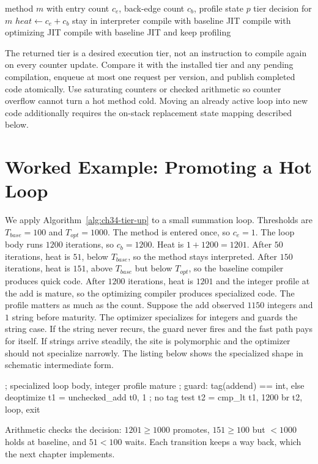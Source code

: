 \begin{algorithm}[htbp]
\caption{Tier promotion from counters and profile maturity}\label{alg:ch34-tier-up}
\begin{pseudocode}
\Require method $m$ with entry count $c_e$, back-edge count $c_b$, profile state $p$
\Ensure tier decision for $m$
\State $heat \gets c_e + c_b$
\State \Return stay in interpreter
\EndIf
{}
\State \Return compile with baseline JIT
\EndIf
{}
\State \Return compile with optimizing JIT
\EndIf
\State \Return compile with baseline JIT and keep profiling
\end{pseudocode}
\end{algorithm}

The returned tier is a desired execution tier, not an instruction to compile again on every counter update.
Compare it with the installed tier and any pending compilation, enqueue at most one request per version, and publish completed code atomically.
Use saturating counters or checked arithmetic so counter overflow cannot turn a hot method cold.
Moving an already active loop into new code additionally requires the on-stack replacement state mapping described below.

\section{Worked Example: Promoting a Hot Loop}\label{sec:ch34-worked}

We apply Algorithm~\ref{alg:ch34-tier-up} to a small summation loop.
Thresholds are $T_{base} = 100$ and $T_{opt} = 1000$.
The method is entered once, so $c_e = 1$.
The loop body runs $1200$ iterations, so $c_b = 1200$.
Heat is $1 + 1200 = 1201$.
After $50$ iterations, heat is $51$, below $T_{base}$, so the method stays interpreted.
After $150$ iterations, heat is $151$, above $T_{base}$ but below $T_{opt}$, so the baseline compiler produces quick code.
After $1200$ iterations, heat is $1201$ and the integer profile at the add is mature, so the optimizing compiler produces specialized code.
The profile matters as much as the count.
Suppose the add observed $1150$ integers and $1$ string before maturity.
The optimizer specializes for integers and guards the string case.
If the string never recurs, the guard never fires and the fast path pays for itself.
If strings arrive steadily, the site is polymorphic and the optimizer should not specialize narrowly.
The listing below shows the specialized shape in schematic intermediate form.
\begin{irlisting}
; specialized loop body, integer profile mature
; guard: tag(addend) == int, else deoptimize
t1 = unchecked_add t0, 1   ; no tag test
t2 = cmp_lt t1, 1200
br t2, loop, exit
\end{irlisting}
Arithmetic checks the decision: $1201 \geq 1000$ promotes, $151 \geq 100$ but $< 1000$ holds at baseline, and $51 < 100$ waits.
Each transition keeps a way back, which the next chapter implements.

